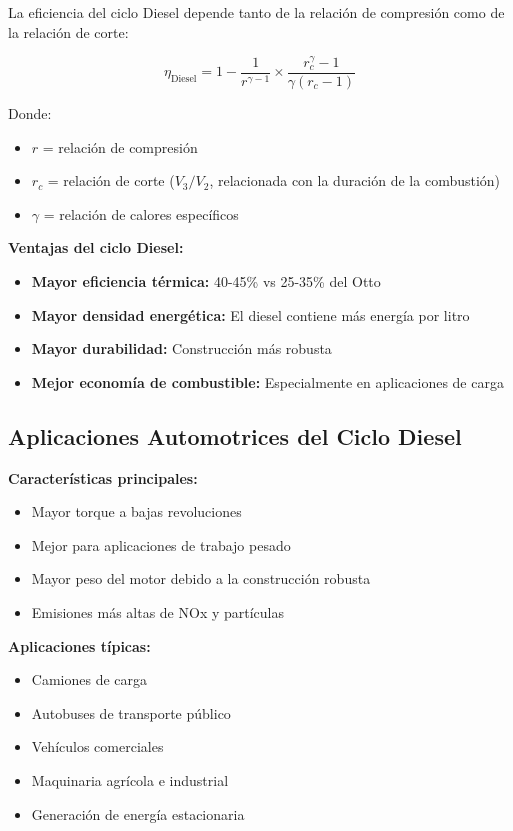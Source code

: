 \documentclass{article}
\begin{document}
La eficiencia del ciclo Diesel depende tanto de la relación de compresión como de la relación de corte:

$$\eta_{\text{Diesel}} = 1 - \frac{1}{r^{\gamma-1}} \times \frac{r_c^\gamma - 1}{\gamma(r_c - 1)}$$

Donde:
\begin{itemize}
    \item $r$ = relación de compresión
    \item $r_c$ = relación de corte ($V_3/V_2$, relacionada con la duración de la combustión)
    \item $\gamma$ = relación de calores específicos
\end{itemize}

\textbf{Ventajas del ciclo Diesel:}
\begin{itemize}
    \item \textbf{Mayor eficiencia térmica:} 40-45\% vs 25-35\% del Otto
    \item \textbf{Mayor densidad energética:} El diesel contiene más energía por litro
    \item \textbf{Mayor durabilidad:} Construcción más robusta
    \item \textbf{Mejor economía de combustible:} Especialmente en aplicaciones de carga
\end{itemize}

\subsection*{Aplicaciones Automotrices del Ciclo Diesel}

\textbf{Características principales:}
\begin{itemize}
    \item Mayor torque a bajas revoluciones
    \item Mejor para aplicaciones de trabajo pesado
    \item Mayor peso del motor debido a la construcción robusta
    \item Emisiones más altas de NOx y partículas
\end{itemize}

\textbf{Aplicaciones típicas:}
\begin{itemize}
    \item Camiones de carga
    \item Autobuses de transporte público
    \item Vehículos comerciales
    \item Maquinaria agrícola e industrial
    \item Generación de energía estacionaria
\end{itemize}
\end{document}
